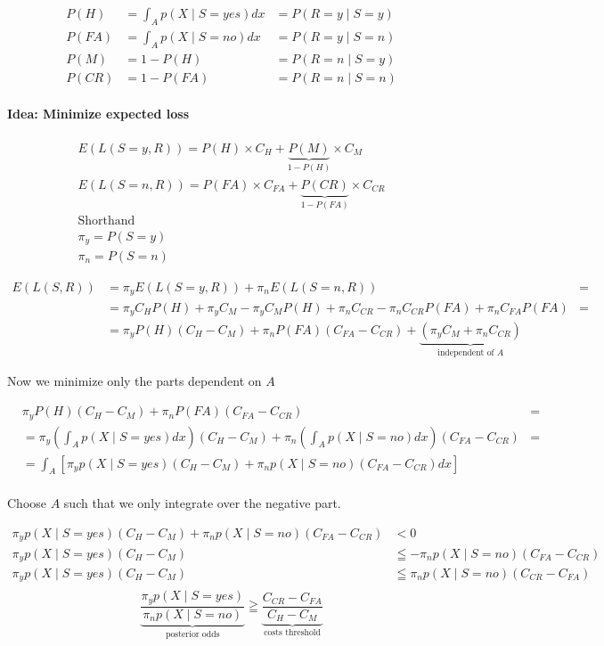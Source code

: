 \begin{align}
P(H) &= \int_A p(X \mid S=yes)dx &= P(R=y \mid S=y) \\
P(FA) &= \int_A p(X \mid S=no)dx &= P(R=y \mid S=n) \\
P(M)  &= 1 - P(H) &= P(R=n \mid S=y)\\
P(CR) &= 1 - P(FA) &= P(R=n \mid S=n)
\end{align}

\paragraph{Idea: Minimize expected loss }

\begin{gather*}
E(L(S=y,R)) = P(H) \times C_H +  \underbrace{P(M)}_{1-P(H)} \times C_M \\
E(L(S=n,R)) = P(FA) \times C_{FA} +  \underbrace{P(CR)}_{1-P(FA)} \times C_{CR} \\
\text{Shorthand} \\
\pi_y = P(S=y) \\
\pi_n = P(S=n)
\end{gather*}

\begin{align*}
E(L(S,R)) &= \pi_y  E(L(S=y, R)) + \pi_n E(L(S=n, R)) &= \\
&= \pi_y C_H  P(H) + \pi_y C_M - \pi_y C_M P(H) + \pi_n C_{CR} - \pi_n C_{CR} P(FA) + \pi_n C_{FA} P(FA) &= \\
&= \pi_y P(H) (C_H - C_M) + \pi_n P(FA) (C_{FA} - C_{CR}) + \underbrace{(\pi_y C_M + \pi_n C_{CR})}_{\text{independent of } A} &
\end{align*}

Now we minimize only the parts dependent on $A$

\begin{align*}
& \pi_y P(H) (C_H - C_M) + \pi_n P(FA) (C_{FA} - C_{CR}) &= \\
&= \pi_y (\int_A p(X \mid S=yes) dx)(C_H - C_M) + \pi_n (\int_A p(X \mid S=no) dx) (C_{FA} - C_{CR}) &= \\
&= \int_A [\pi_y p(X \mid S=yes)(C_H - C_M) + \pi_n p(X \mid S=no)(C_{FA} - C_{CR}) dx] & \\
\end{align*}

Choose $A$ such that we only integrate over the negative part.

\begin{align*}
\pi_y p(X \mid S=yes)(C_H - C_M) + \pi_n p(X \mid S=no)(C_{FA} - C_{CR}) &< 0 \\
\pi_y p(X \mid S=yes)(C_H - C_M) &\leqq - \pi_n p(X \mid S=no)(C_{FA} - C_{CR}) \\
\pi_y p(X \mid S=yes)(C_H - C_M) &\leqq \pi_n p(X \mid S=no)(C_{CR} - C_{FA}) \\
\end{align*}
\begin{equation}
\underbrace{\frac{\pi_y p(X \mid S=yes)}{\pi_n p(X \mid S=no)}}_\text{posterior odds} \geqq \underbrace{\frac{C_{CR} - C_{FA}}{C_H - C_M}}_\text{costs threshold}
\end{equation}


